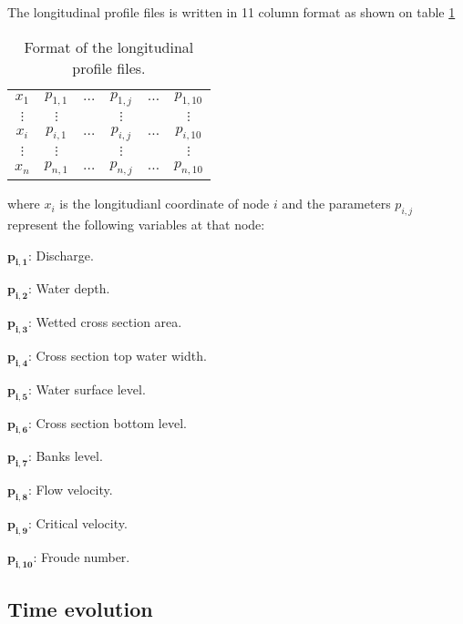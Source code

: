 \documentclass[a4paper,12pt]{article}
\newcommand{\TABLE}[4]
{
	\begin{table}[ht!]\centering
	\begin{tabular}{#1}\hline#2\\\hline\end{tabular}
	\caption{#3.\label{#4}}\end{table}
}
\begin{document}
The longitudinal profile files is written in 11 column format as shown on
table \ref{TabPerfil}
\TABLE{cccccc}
{
	$x_1$&$p_{1,1}$&$\dots$&$p_{1,j}$&$\dots$&$p_{1,10}$\\
	$\vdots$&$\vdots$&&$\vdots$&&$\vdots$\\
	$x_i$&$p_{i,1}$&$\dots$&$p_{i,j}$&$\dots$&$p_{i,10}$\\
	$\vdots$&$\vdots$&&$\vdots$&&$\vdots$\\
	$x_n$&$p_{n,1}$&$\dots$&$p_{n,j}$&$\dots$&$p_{n,10}$
}{Format of the longitudinal profile files}{TabPerfil}
where $x_i$ is the longitudianl coordinate of node $i$ and the parameters
$p_{i,j}$ represent the following variables at that node:
\begin{description}
\item $\mathbf{p_{i,1}}$: Discharge.
\item $\mathbf{p_{i,2}}$: Water depth.
\item $\mathbf{p_{i,3}}$: Wetted cross section area.
\item $\mathbf{p_{i,4}}$: Cross section top water width.
\item $\mathbf{p_{i,5}}$: Water surface level.
\item $\mathbf{p_{i,6}}$: Cross section bottom level.
\item $\mathbf{p_{i,7}}$: Banks level.
\item $\mathbf{p_{i,8}}$: Flow velocity.
\item $\mathbf{p_{i,9}}$: Critical velocity.
\item $\mathbf{p_{i,10}}$: Froude number.
\end{description}

\subsection{Time evolution}
\end{document}
